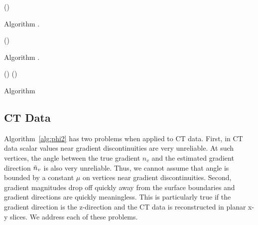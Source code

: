 \begin{algorithm}[h]
\Return(\true)
\caption{Algorithm \protect\DoesOrthMatchA.}
\label{alg:orthA}
\end{algorithm}
\begin{algorithm}[h]
\Return(\false)
\caption{Algorithm \protect\DoesOrthMatchB.}
\label{alg:orthB}
\end{algorithm}

\begin{algorithm}[h]
{ \Return(\true) }
{ \Return(\true)}
\lElse{ \Return(\false)}
\caption{Algorithm \protect\FindReliable}
\label{alg:phi3}
\end{algorithm}



\subsection{CT Data}

Algorithm~\ref{alg:phi2} has two problems when applied to CT data.
First, 
in CT data scalar values near gradient discontinuities
are very unreliable.
At such vertices, the angle between the true gradient $n_v$
and the estimated gradient direction $\tilde{n}_v$ is also very unreliable.
Thus, we cannot assume that angle is bounded by a constant $\mu$
on vertices near gradient discontinuities.
Second, gradient magnitudes drop off quickly away from the surface boundaries
and gradient directions are quickly meaningless.
This is particularly true if the gradient direction is the z-direction
and the CT data is reconstructed in planar x-y slices.
We address each of these problems.

